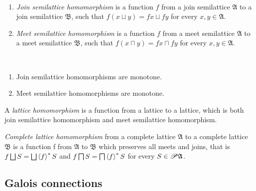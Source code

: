 \begin{defn}
~
\begin{enumerate}
\item {}\emph{Join semilattice homomorphism}
is a function $f$ from a join semilattice $\mathfrak{A}$ to a join
semilattice $\mathfrak{B}$, such that $f(x\sqcup y)=fx\sqcup fy$
for every $x,y\in\mathfrak{A}$.
\item {}\emph{Meet semilattice homomorphism}
is a function $f$ from a meet semilattice $\mathfrak{A}$ to a meet
semilattice $\mathfrak{B}$, such that $f(x\sqcap y)=fx\sqcap fy$
for every $x,y\in\mathfrak{A}$.
\end{enumerate}
\end{defn}
\begin{obvious}
~
\begin{enumerate}
\item Join semilattice homomorphisms are monotone.
\item Meet semilattice homomorphisms are monotone.
\end{enumerate}
\end{obvious}
\begin{defn}
A \emph{lattice homomorphism} is a function
from a lattice to a lattice, which is both join semilattice homomorphism
and meet semilattice homomorphism.
\end{defn}

\begin{defn}
\emph{Complete lattice homomorphism}
from a complete lattice $\mathfrak{A}$ to a complete lattice $\mathfrak{B}$
is a function f from $\mathfrak{A}$ to $\mathfrak{B}$ which preserves
all meets and joins, that is $f\bigsqcup S=\bigsqcup\left\langle f\right\rangle ^{\ast}S$
and $f\bigsqcap S=\bigsqcap\left\langle f\right\rangle ^{\ast}S$ for every $S\in\mathscr{P}\mathfrak{A}$.
\end{defn}

\subsection{Galois connections}

